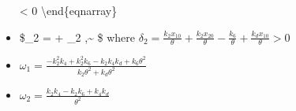 \documentclass[11pt]{article}
\begin{document}
\begin{itemize}
   \textless{} 0
  \textbackslash end\{eqnarray\}
\item
  \$\phi\_2 =
  + \delta\_2 \pi,\textasciitilde{} \$ where
  \(\delta_2 = \frac{k_{2} x_{1 0}}{\theta} + \frac{k_{2} x_{2 0}}{\theta} - \frac{k_{6}}{\theta} + \frac{k_{d} x_{1 0}}{\theta} > 0\)
\item
  \(\omega_1 = \frac{- k_{2}^{2} k_{4} + k_{2}^{2} k_{6} - k_{2} k_{4} k_{d} + k_{6} \theta^{2}}{k_{2} \theta^{2} + k_{d} \theta^{2}}\)
\item
  \(\omega_2 = \frac{k_{2} k_{4} - k_{2} k_{6} + k_{4} k_{d}}{\theta^{2}}\)
\end{itemize}


    
    
    
\end{document}
